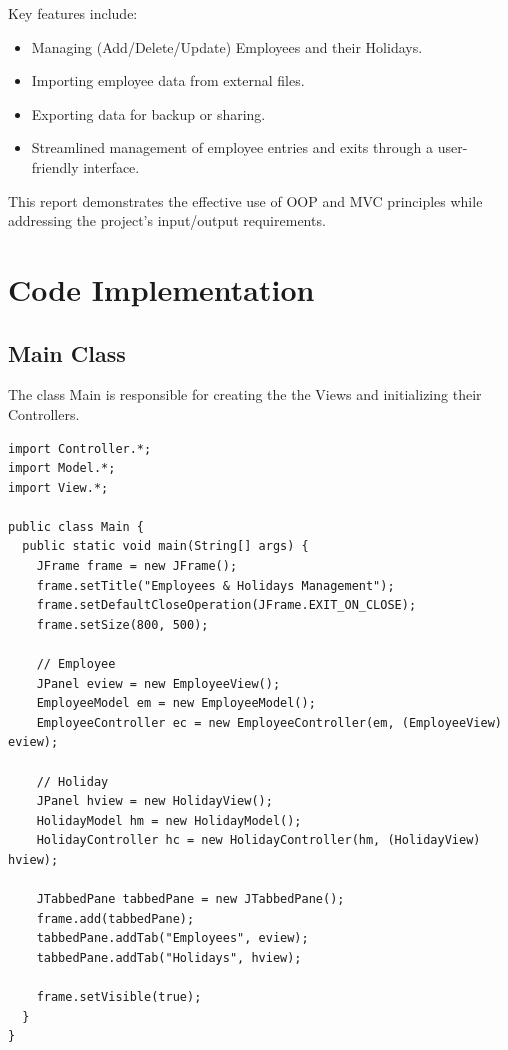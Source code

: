\documentclass[12pt]{article}
\begin{document}
Key features include:
\begin{itemize}
  \item Managing (Add/Delete/Update) Employees and their Holidays.
  \item Importing employee data from external files.
  \item Exporting data for backup or sharing.
  \item Streamlined management of employee entries and exits through a user-friendly interface.
\end{itemize}
This report demonstrates the effective use of OOP and MVC principles while addressing the project’s input/output requirements.

\pagebreak

\section{Code Implementation}

\subsection{Main Class}

The class Main is responsible for creating the the Views
and initializing their Controllers.

\begin{lstlisting}
import Controller.*;
import Model.*;
import View.*;

public class Main {
  public static void main(String[] args) {
    JFrame frame = new JFrame();
    frame.setTitle("Employees & Holidays Management");
    frame.setDefaultCloseOperation(JFrame.EXIT_ON_CLOSE);
    frame.setSize(800, 500);

    // Employee
    JPanel eview = new EmployeeView();
    EmployeeModel em = new EmployeeModel();
    EmployeeController ec = new EmployeeController(em, (EmployeeView) eview);

    // Holiday
    JPanel hview = new HolidayView();
    HolidayModel hm = new HolidayModel();
    HolidayController hc = new HolidayController(hm, (HolidayView) hview);

    JTabbedPane tabbedPane = new JTabbedPane();
    frame.add(tabbedPane);
    tabbedPane.addTab("Employees", eview);
    tabbedPane.addTab("Holidays", hview);

    frame.setVisible(true);
  }
}
\end{lstlisting}

\pagebreak
\end{document}
